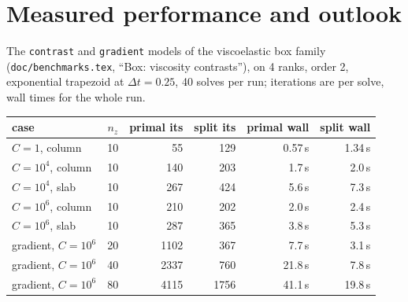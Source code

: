 \documentclass[11pt]{article}
\numberwithin{equation}{section}
\theoremstyle{remark}
\newcommand{\code}[1]{\texttt{#1}}
\begin{document}
\section{Measured performance and outlook}
\label{sec:results}

The \code{contrast} and \code{gradient} models of the viscoelastic box
family (\code{doc/benchmarks.tex}, ``Box: viscosity contrasts''), on 4
ranks, order 2, exponential trapezoid at $\Delta t = 0.25$, 40 solves per
run; iterations are per solve, wall times for the whole run.
\begin{center}
\small
\begin{tabular}{@{}lrrrrr@{}}
\toprule
case & $n_z$ & primal its & split its & primal wall & split wall \\
\midrule
$C = 1$, column & 10 & 55 & 129 & 0.57\,s & 1.34\,s \\
$C = 10^4$, column & 10 & 140 & 203 & 1.7\,s & 2.0\,s \\
$C = 10^4$, slab & 10 & 267 & 424 & 5.6\,s & 7.3\,s \\
$C = 10^6$, column & 10 & 210 & 202 & 2.0\,s & 2.4\,s \\
$C = 10^6$, slab & 10 & 287 & 365 & 3.8\,s & 5.3\,s \\
gradient, $C = 10^6$ & 20 & 1102 & 367 & 7.7\,s & 3.1\,s \\
gradient, $C = 10^6$ & 40 & 2337 & 760 & 21.8\,s & 7.8\,s \\
gradient, $C = 10^6$ & 80 & 4115 & 1756 & 41.1\,s & 19.8\,s \\
\bottomrule
\end{tabular}
\end{center}
\end{document}
